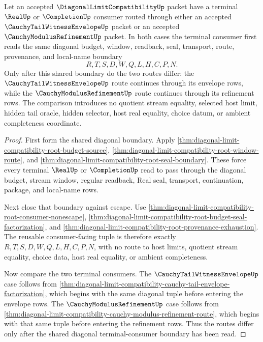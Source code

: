 \begin{theorem}
\label{thm:diagonal-limit-compatibility-shared-terminal-consumer-comparison}
Let an accepted $\DiagonalLimitCompatibilityUp$ packet have a terminal $\RealUp$ or $\CompletionUp$ consumer routed through either an accepted $\CauchyTailWitnessEnvelopeUp$ packet or an accepted $\CauchyModulusRefinementUp$ packet. In both cases the terminal consumer first reads the same diagonal budget, window, readback, seal, transport, route, provenance, and local-name boundary
$$
R,T,S,D,W,Q,L,H,C,P,N.
$$
Only after this shared boundary do the two routes differ: the $\CauchyTailWitnessEnvelopeUp$ route continues through its envelope rows, while the $\CauchyModulusRefinementUp$ route continues through its refinement rows. The comparison introduces no quotient stream equality, selected host limit, hidden tail oracle, hidden selector, host real equality, choice datum, or ambient completeness coordinate.
\end{theorem}
\begin{proof}
First form the shared diagonal boundary. Apply \autoref{thm:diagonal-limit-compatibility-root-budget-source}, \autoref{thm:diagonal-limit-compatibility-root-window-route}, and \autoref{thm:diagonal-limit-compatibility-root-seal-boundary}. These force every terminal $\RealUp$ or $\CompletionUp$ read to pass through the diagonal budget, stream window, regular readback, Real seal, transport, continuation, package, and local-name rows.

Next close that boundary against escape. Use \autoref{thm:diagonal-limit-compatibility-root-consumer-nonescape}, \autoref{thm:diagonal-limit-compatibility-root-budget-seal-factorization}, and \autoref{thm:diagonal-limit-compatibility-root-provenance-exhaustion}. The reusable consumer-facing tuple is therefore exactly $R,T,S,D,W,Q,L,H,C,P,N$, with no route to host limits, quotient stream equality, choice data, host real equality, or ambient completeness.

Now compare the two terminal consumers. The $\CauchyTailWitnessEnvelopeUp$ case follows from \autoref{thm:diagonal-limit-compatibility-cauchy-tail-envelope-factorization}, which begins with the same diagonal tuple before entering the envelope rows. The $\CauchyModulusRefinementUp$ case follows from \autoref{thm:diagonal-limit-compatibility-cauchy-modulus-refinement-route}, which begins with that same tuple before entering the refinement rows. Thus the routes differ only after the shared diagonal terminal-consumer boundary has been read.
\end{proof}

